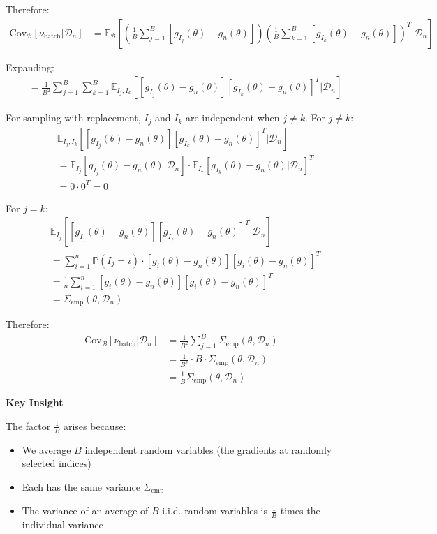 \documentclass[11pt]{article}
\begin{document}
Therefore:
\begin{align}
\text{Cov}_{\mathcal{B}}[\nu_{\text{batch}} | \mathcal{D}_n] &= \mathbb{E}_{\mathcal{B}}\left[\left(\frac{1}{B} \sum_{j=1}^B [g_{I_j}(\theta) - g_n(\theta)]\right)\left(\frac{1}{B} \sum_{k=1}^B [g_{I_k}(\theta) - g_n(\theta)]\right)^T \bigg| \mathcal{D}_n\right]
\end{align}

Expanding:
\begin{align}
&= \frac{1}{B^2} \sum_{j=1}^B \sum_{k=1}^B \mathbb{E}_{I_j,I_k}\left[[g_{I_j}(\theta) - g_n(\theta)][g_{I_k}(\theta) - g_n(\theta)]^T | \mathcal{D}_n\right]
\end{align}

For sampling with replacement, $I_j$ and $I_k$ are independent when $j \neq k$. For $j \neq k$:
\begin{align}
&\mathbb{E}_{I_j,I_k}[[g_{I_j}(\theta) - g_n(\theta)][g_{I_k}(\theta) - g_n(\theta)]^T | \mathcal{D}_n] \\
&= \mathbb{E}_{I_j}[g_{I_j}(\theta) - g_n(\theta) | \mathcal{D}_n] \cdot \mathbb{E}_{I_k}[g_{I_k}(\theta) - g_n(\theta) | \mathcal{D}_n]^T \\
&= 0 \cdot 0^T = 0
\end{align}

For $j = k$:
\begin{align}
&\mathbb{E}_{I_j}[[g_{I_j}(\theta) - g_n(\theta)][g_{I_j}(\theta) - g_n(\theta)]^T | \mathcal{D}_n] \\
&= \sum_{i=1}^n \mathbb{P}(I_j = i) \cdot [g_i(\theta) - g_n(\theta)][g_i(\theta) - g_n(\theta)]^T \\
&= \frac{1}{n} \sum_{i=1}^n [g_i(\theta) - g_n(\theta)][g_i(\theta) - g_n(\theta)]^T \\
&= \Sigma_{\text{emp}}(\theta, \mathcal{D}_n)
\end{align}

Therefore:
\begin{align}
\text{Cov}_{\mathcal{B}}[\nu_{\text{batch}} | \mathcal{D}_n] &= \frac{1}{B^2} \sum_{j=1}^B \Sigma_{\text{emp}}(\theta, \mathcal{D}_n) \\
&= \frac{1}{B^2} \cdot B \cdot \Sigma_{\text{emp}}(\theta, \mathcal{D}_n) \\
&= \frac{1}{B} \Sigma_{\text{emp}}(\theta, \mathcal{D}_n)
\end{align}

\textbf{Key Insight}

The factor $\frac{1}{B}$ arises because:
\begin{itemize}
    \item We average $B$ independent random variables (the gradients at randomly selected indices)
    \item Each has the same variance $\Sigma_{\text{emp}}$
    \item The variance of an average of $B$ i.i.d. random variables is $\frac{1}{B}$ times the individual variance
\end{itemize}
\end{document}
